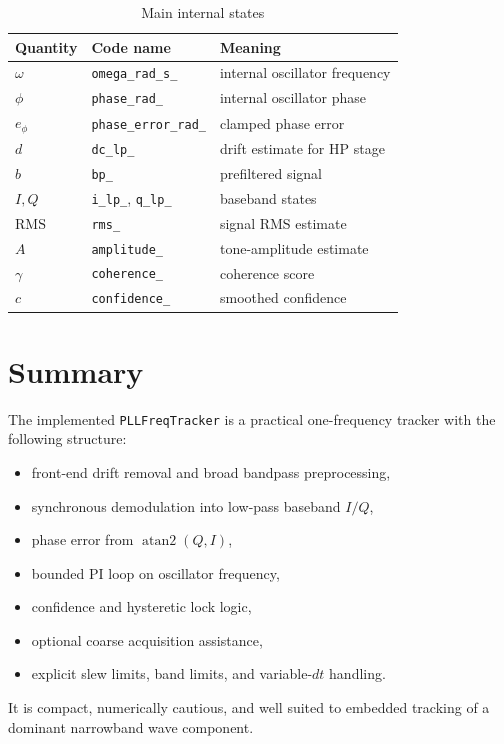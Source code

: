\documentclass[conference]{IEEEtran}
\begin{document}
\begin{table}[t]
  \centering
  \caption{Main internal states}
  \label{tab:states}
  \small
  \begin{tabular}{@{}lll@{}}
    \toprule
    Quantity & Code name & Meaning \\
    \midrule
    \(\omega\) & \texttt{omega\_rad\_s\_} & internal oscillator frequency \\
    \(\phi\) & \texttt{phase\_rad\_} & internal oscillator phase \\
    \(e_\phi\) & \texttt{phase\_error\_rad\_} & clamped phase error \\
    \(d\) & \texttt{dc\_lp\_} & drift estimate for HP stage \\
    \(b\) & \texttt{bp\_} & prefiltered signal \\
    \(I,Q\) & \texttt{i\_lp\_}, \texttt{q\_lp\_} & baseband states \\
    \(\mathrm{RMS}\) & \texttt{rms\_} & signal RMS estimate \\
    \(A\) & \texttt{amplitude\_} & tone-amplitude estimate \\
    \(\gamma\) & \texttt{coherence\_} & coherence score \\
    \(c\) & \texttt{confidence\_} & smoothed confidence \\
    \bottomrule
  \end{tabular}
\end{table}

\section{Summary}

The implemented \texttt{PLLFreqTracker} is a practical one-frequency tracker
with the following structure:
\begin{itemize}[leftmargin=1.4em]
  \item front-end drift removal and broad bandpass preprocessing,
  \item synchronous demodulation into low-pass baseband \(I/Q\),
  \item phase error from \(\operatorname{atan2}(Q,I)\),
  \item bounded PI loop on oscillator frequency,
  \item confidence and hysteretic lock logic,
  \item optional coarse acquisition assistance,
  \item explicit slew limits, band limits, and variable-\(dt\) handling.
\end{itemize}

It is compact, numerically cautious, and well suited to embedded tracking of a
dominant narrowband wave component.
\end{document}
